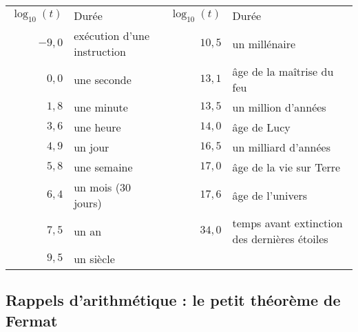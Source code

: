 \begin{center}
  \begin{tabular}{rl rp{4cm}}
  $\log_{10}(t)$ & Durée &   $\log_{10}(t)$ & Durée \\
  $-9,0$ & exécution d'une instruction &  $10,5$ & un millénaire\\
  $0,0$ & une seconde &  $13,1$ & âge de la maîtrise du feu\\
  $1,8$ & une minute &  $13,5$ & un million d'années\\
  $3,6$ & une heure &  $14,0$ & âge de Lucy\\
  $4,9$ & un jour &  $16,5$ & un milliard d'années\\
  $5,8$ & une semaine&  $17,0$ & âge de la vie sur Terre\\
  $6,4$ & un mois (30 jours)&  $17,6$ & âge de l'univers\\
  $7,5$ & un an &  $34,0$ & temps avant extinction des dernières étoiles\\
  $9,5$ & un siècle\\
\end{tabular}
\end{center}

%
%


%

\subsection{Rappels d'arithmétique : le petit théorème de Fermat}

